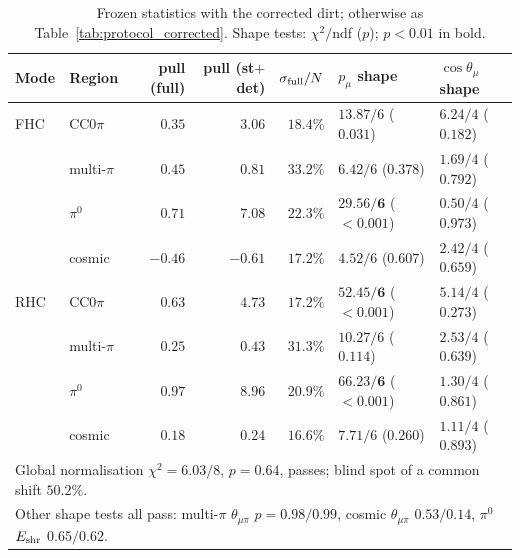 \documentclass[11pt,a4paper]{article}
\begin{document}
\begin{table}[H]
  \centering
  \caption{Frozen statistics with the corrected dirt; otherwise as Table~\ref{tab:protocol_corrected}. Shape tests:
    $\chi^2/$ndf ($p$); $p<0.01$ in bold.}
  \label{tab:protocol_dirtfix}
  \small
  \begin{tabular}{llrrr|ll}
    \toprule
    Mode & Region & pull (full) & pull (st$+$det) & $\sigma_{\rm full}/N$ & $p_\mu$ shape & $\cos\theta_\mu$ shape \\
    \midrule
    FHC & CC$0\pi$    & $0.35$ & $3.06$ & $18.4\%$ & $13.87/6$ ($0.031$) & $6.24/4$ ($0.182$) \\
        & multi-$\pi$ & $0.45$ & $0.81$ & $33.2\%$ & $6.42/6$ ($0.378$) & $1.69/4$ ($0.792$) \\
        & $\pi^0$     & $0.71$ & $7.08$ & $22.3\%$ & $\mathbf{29.56/6}$ ($\mathbf{<0.001}$) & $0.50/4$ ($0.973$) \\
        & cosmic      & $-0.46$ & $-0.61$ & $17.2\%$ & $4.52/6$ ($0.607$) & $2.42/4$ ($0.659$) \\
    \midrule
    RHC & CC$0\pi$    & $0.63$ & $4.73$ & $17.2\%$ & $\mathbf{52.45/6}$ ($\mathbf{<0.001}$) & $5.14/4$ ($0.273$) \\
        & multi-$\pi$ & $0.25$ & $0.43$ & $31.3\%$ & $10.27/6$ ($0.114$) & $2.53/4$ ($0.639$) \\
        & $\pi^0$     & $0.97$ & $8.96$ & $20.9\%$ & $\mathbf{66.23/6}$ ($\mathbf{<0.001}$) & $1.30/4$ ($0.861$) \\
        & cosmic      & $0.18$ & $0.24$ & $16.6\%$ & $7.71/6$ ($0.260$) & $1.11/4$ ($0.893$) \\
    \midrule
    \multicolumn{7}{l}{Global normalisation $\chi^2 = 6.03/8$, $p=0.64$, passes; blind spot of a common shift $50.2\%$.} \\
    \multicolumn{7}{l}{Other shape tests all pass: multi-$\pi$ $\theta_{\mu\pi}$ $p=0.98/0.99$, cosmic $\theta_{\mu\pi}$ $0.53/0.14$, $\pi^0$ $E_{\rm shr}$ $0.65/0.62$.} \\
    \bottomrule
  \end{tabular}
\end{table}
\end{document}
